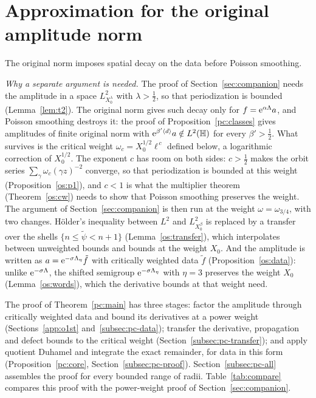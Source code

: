 \section{Approximation for the original amplitude norm}\label{sec:dd}\label{sec:printed}
The original norm imposes spatial decay on the data before Poisson smoothing.

\medskip\noindent\emph{Why a separate argument is needed.} The proof of Section~\ref{sec:companion} needs the amplitude in a space
$L^2_{X_0^\lambda}$ with $\lambda>\tfrac12$, so that periodization is bounded (Lemma~\ref{lem:t2}). The original norm gives such decay only
for $f=\mathrm{e}^{\alpha\Lambda}a$, and Poisson smoothing destroys it: the proof of Proposition~\ref{pc:classes} gives amplitudes of finite
original norm with $\mathrm{e}^{\beta'\langle d\rangle}a\notin L^2(\mathbb{H})$ for every $\beta'>\tfrac12$. What survives is the critical
weight $\omega_c=X_0^{1/2}\ell^{\,c}$ defined below, a logarithmic correction of $X_0^{1/2}$. The exponent $c$ has room on both sides:
$c>\tfrac12$ makes the orbit series $\sum_\gamma\omega_c(\gamma z)^{-2}$ converge, so that periodization is bounded at this weight
(Proposition~\ref{os:p1}), and $c<1$ is what the multiplier theorem (Theorem~\ref{os:cw}) needs to show that Poisson smoothing preserves
the weight. The argument of Section~\ref{sec:companion} is then run at the weight $\omega=\omega_{3/4}$, with two changes. H\"older's
inequality between $L^2$ and $L^2_{X_0^\beta}$ is replaced by a transfer over the shells $\{n\le\tilde\psi<n+1\}$
(Lemma~\ref{os:transfer}), which interpolates between unweighted bounds and bounds at the weight $X_0$. And the amplitude is written as
$a=\mathrm{e}^{-\sigma\Lambda_\eta}\tilde f$ with critically weighted data $\tilde f$ (Proposition~\ref{os:data}): unlike $\mathrm{e}^{-\sigma\Lambda}$, the
shifted semigroup $\mathrm{e}^{-\sigma\Lambda_\eta}$ with $\eta=3$ preserves the weight $X_0$ (Lemma~\ref{os:words}), which the derivative bounds at
that weight need.

The proof of Theorem~\ref{pc:main} has three stages: factor the amplitude through critically weighted data and bound its derivatives at a power
weight (Sections~\ref{app:o1st} and~\ref{subsec:pc-data}); transfer the derivative, propagation and defect bounds to the
critical weight (Section~\ref{subsec:pc-transfer}); and apply quotient Duhamel and integrate the exact remainder, for data in
this form (Proposition~\ref{pc:core}, Section~\ref{subsec:pc-proof}). Section~\ref{subsec:pc-all} assembles the proof for every bounded range of
radii. Table~\ref{tab:compare} compares this proof with the power-weight proof of Section~\ref{sec:companion}.

